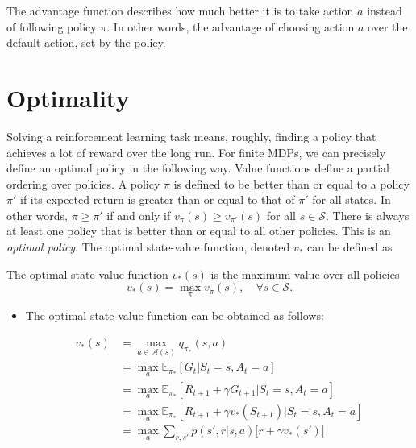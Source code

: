 The advantage function describes how much better it is to take action $a$ instead of following policy $\pi$. In other words, the advantage of choosing action $a$ over the default action, set by the policy.

\section{Optimality}

Solving a reinforcement learning task means, roughly, finding a policy that achieves a lot of reward over the long run. For finite MDPs, we can precisely define an optimal policy in the following way. Value functions define a partial ordering over policies. A policy $\pi$ is defined to be better than or equal to a policy $\pi'$ if its expected return is greater than or equal to that of $\pi'$ for all states. In other words, $\pi\geq \pi'$ if and only if $v_\pi(s)\geq v_{\pi'}(s)$ for all $s\in \mathcal{S}$. There is always at least one policy that is better than or equal to all other policies. This is an \textit{optimal policy}. The optimal state-value function, denoted $v_*$ can be defined as 


\begin{definition}
	The optimal state-value function $v_{*}(s)$ is the maximum value over all policies
	$$v_{*}(s) = \max_{\pi} v_{\pi}(s),\quad \forall s\in \mathcal{S}.$$
\end{definition}

\begin{itemize}
	\item The optimal state-value function can be obtained as follows:

		\begin{align*}
			v_*(s) &= \max_{a\in \mathcal{A}(s)}q_{\pi_*}(s,a)\\
			&= \max_a \mathbb{E}_{\pi_*}[G_t| S_t=s, A_t=a]\\
			&= \max_a \mathbb{E}_{\pi_*}[R_{t+1}+\gamma G_{t+1}| S_t=s, A_t=a]\\
			&= \max_a \mathbb{E}_{\pi_*}[R_{t+1}+\gamma v_*(S_{t+1})| S_t=s, A_t=a]\\
			&= \max_a \sum_{r,s'}p(s',r|s,a)\Big[r + \gamma  v_*(s')\Big] 
	\end{align*}

\end{itemize}

